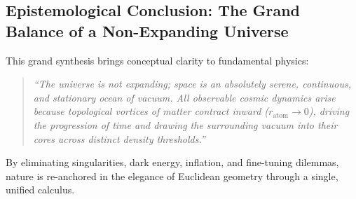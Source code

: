 \subsection{Epistemological Conclusion: The Grand Balance of a Non-Expanding Universe}
\label{sec:epistemolojik_sonuc}

This grand synthesis brings conceptual clarity to fundamental physics:
\begin{quote}
    \small
    \textit{``The universe is not expanding; space is an absolutely serene, continuous, and stationary ocean of vacuum. All observable cosmic dynamics arise because topological vortices of matter contract inward ($r_{\mathrm{atom}} \to 0$), driving the progression of time and drawing the surrounding vacuum into their cores across distinct density thresholds.''}
\end{quote}
By eliminating singularities, dark energy, inflation, and fine-tuning dilemmas, nature is re-anchored in the elegance of Euclidean geometry through a single, unified calculus.
